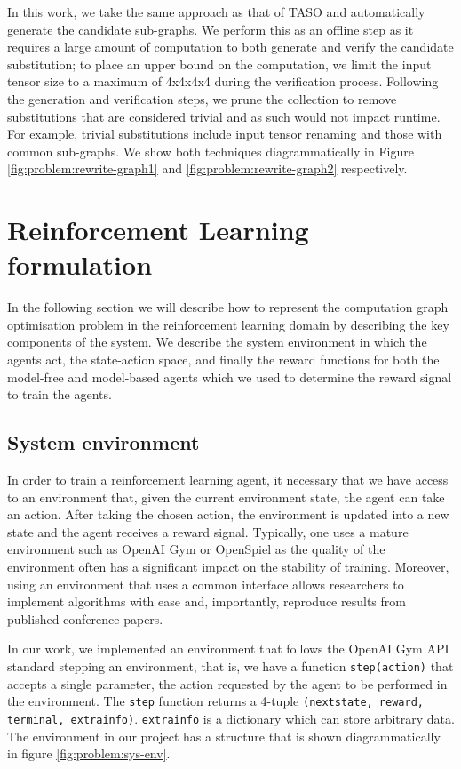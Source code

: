 In this work, we take the same approach as that of TASO and automatically generate the candidate sub-graphs. We perform this as an offline step as it requires a large amount of computation to both generate and verify the candidate substitution; to place an upper bound on the computation, we limit the input tensor size to a maximum of 4x4x4x4 during the verification process. Following the generation and verification steps, we prune the collection to remove substitutions that are considered trivial and as such would not impact runtime. For example, trivial substitutions include input tensor renaming and those with common sub-graphs. We show both techniques diagrammatically in Figure \ref{fig:problem:rewrite-graph1} and \ref{fig:problem:rewrite-graph2} respectively.



\section{Reinforcement Learning formulation}
In the following section we will describe how to represent the computation graph optimisation problem in the reinforcement learning domain by describing the key components of the system. We describe the system environment in which the agents act, the state-action space, and finally the reward functions for both the model-free and model-based agents which we used to determine the reward signal to train the agents.

\subsection{System environment}
\label{sec:prob:subsec:sysenv}

In order to train a reinforcement learning agent, it necessary that we have access to an environment that, given the current environment state, the agent can take an action. After taking the chosen action, the environment is updated into a new state and the agent receives a reward signal. Typically, one uses a mature environment such as OpenAI Gym \cite{brockman2016openai} or OpenSpiel \cite{LanctotEtAl2019OpenSpiel} as the quality of the environment often has a significant impact on the stability of training. Moreover, using an environment that uses a common interface allows researchers to implement algorithms with ease and, importantly, reproduce results from published conference papers.

In our work, we implemented an environment that follows the OpenAI Gym API standard stepping an environment, that is, we have a function \texttt{step(action)} that accepts a single parameter, the action requested by the agent to be performed in the environment. The \texttt{step} function returns a 4-tuple \texttt{(next\textunderscore state, reward, terminal, extra\textunderscore info)}. \texttt{extra\textunderscore info} is a dictionary which can store arbitrary data. The environment in our project has a structure that is shown diagrammatically in figure \ref{fig:problem:sys-env}.

